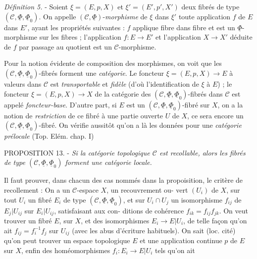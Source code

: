 
\emph{Définition 5.} - Soient $\xi = (E,p,X)$ et $\xi' = (E',p',X')$ deux fibrés de
type $(\mathcal{C},\underline{\Phi},\underline{\Phi}_0)$. On appelle $(\mathcal{C},\underline{\Phi})$-\emph{morphisme} de $\xi$ dans $\xi'$
toute application $f$ de $E$ dans $E'$, ayant les propriétés suivantes : $f$
applique fibre dans fibre et est un $\underline{\Phi}$-morphisme sur les fibres ;
l'application $f : E \longrightarrow E'$ et l'application $X \longrightarrow X'$ déduite de $f$ par
passage au quotient est un $\mathcal{C}$-morphisme.

Pour la notion évidente de composition des morphismes, on voit que
les $(\mathcal{C},\underline{\Phi},\underline{\Phi}_0)$-fibrés forment une \emph{catégorie}. Le foncteur
$\xi = (E,p,X) \longrightarrow E$ à valeurs dans $\mathcal{C}$ est \emph{transportable} et \emph{fidèle}
(d'où l'identification de $\xi$ à $E$) ; le foncteur $\xi = (E,p,X) \longrightarrow X$ de la
catégorie des $(\mathcal{C},\underline{\Phi},\underline{\Phi}_0)$-fibrés dans $\mathcal{C}$ est appelé \emph{foncteur-base}.
D'autre part, si $E$ est un $(\mathcal{C},\underline{\Phi},\underline{\Phi}_0)$-fibré sur $X$, on a la notion
de \emph{restriction} de ce fibré à une partie ouverte $U$ de $X$, ce sera encore
un $(\mathcal{C},\underline{\Phi},\underline{\Phi}_0)$-fibré. On vérifie aussitôt qu'on a là les données
pour une \emph{catégorie prélocale} (Top. Elém. chap. I)

PROPOSITION 13. - \emph{Si la catégorie topologique $\mathcal{C}$ est recollable, alors
les fibrés de type $(\mathcal{C},\underline{\Phi},\underline{\Phi}_0)$ forment une catégorie locale.}

Il faut prouver, dans chacun des cas nommés dans la propoisition,
le critère de recollement : On a un $\mathcal{C}$-espace $X$, un recouvrement ou-
vert $(U_i)$ de $X$, sur tout $U_i$ un fibré $E_i$ de type $(\mathcal{C},\underline{\Phi},\underline{\Phi}_0)$, et sur
$U_i \cap U_j$ un isomorphisme $f_{ij}$ de $E_j|U_{ij}$ sur $E_i|U_{ij}$, satisfaisant aux con-
ditions de cohérence $f_{ik} = f_{ij}f_{jk}$. On veut trouver un fibré $E$, sur $X$,
et des isomorphismes $E_i \longrightarrow E|U_i$, de telle façon qu'on ait $f_{ij} = f_i^{-1} f_j$
sur $U_{ij}$ (avec les abus d'écriture habituels). On sait (loc. cité)
qu'on peut trouver un espace topologique $E$ et une application continue
$p$ de $E$ sur $X$, enfin des homéomorphismes $f_i : E_i \longrightarrow E|U_i$ tels qu'on ait

\newpage

